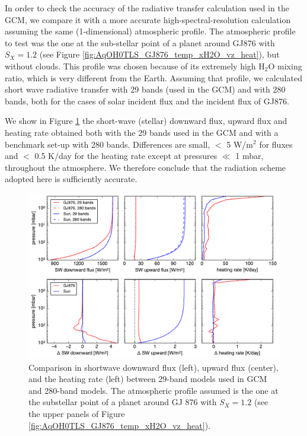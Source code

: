 \documentclass[11pt,numberedappendix,twocolappendix,]{emulateapj}
\def\water{H$_2$O }
\begin{document}
In order to check the accuracy of the radiative transfer calculation used in the GCM, we compare it with a more accurate high-spectral-resolution calculation assuming the same (1-dimensional) atmospheric profile. 
The atmospheric profile to test was the one at the sub-stellar point of a planet around GJ876 with $S_X=1.2$ (see Figure \ref{fig:AqOH0TLS_GJ876_temp_xH2O_vz_heat}), but without clouds. 
This profile was chosen because of its extremely high \water mixing ratio, which is very different from the Earth. 
Assuming that profile, we calculated short wave radiative transfer with 29 bands (used in the GCM) and with 280 bands, both for the cases of solar incident flux and the incident flux of GJ876. 

We show in Figure \ref{fig:socrates} the short-wave (stellar) downward flux, upward flux and heating rate obtained both with the 29 bands used in the GCM and with a benchmark set-up with 280 bands. Differences are small, $<$ 5 W/m$^2$ for fluxes and $<$ 0.5 K/day for the heating rate except at pressures $\ll$ 1 mbar, throughout the atmosphere. We therefore conclude that the radiation scheme adopted here is sufficiently accurate.

\begin{figure}[!htb]
    \begin{center}
    \includegraphics[width=0.8\hsize]{fig/rad_comparison_SW29-SW280_AqOH0TLS_GJ876S12P20L40Q.pdf}
    \end{center}
\caption{Comparison in shortwave downward flux (left), upward flux (center), and the heating rate (left) between 29-band models used in GCM and 280-band models. The atmospheric profile assumed is the one at the substellar point of a planet around GJ 876 with $S_X=1.2$ (see the upper panels of Figure \ref{fig:AqOH0TLS_GJ876_temp_xH2O_vz_heat}). }
\label{fig:socrates}
\end{figure}
\end{document}
